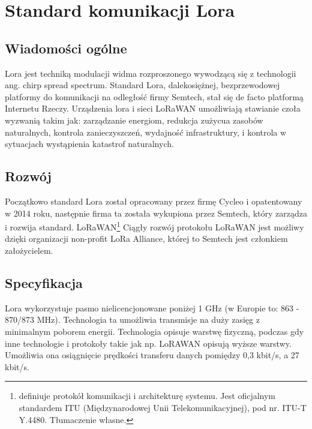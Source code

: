 \newpage %
\section{Standard komunikacji Lora}
\subsection{Wiadomości ogólne}
Lora\cite{lora} jest techniką modulacji widma rozproszonego wywodzącą się z technologii ang. chirp spread spectrum.
Standard Lora, dalekosiężnej, bezprzewodowej platformy do komunikacji na odległość firmy Semtech, stał się de facto platformą Internetu Rzeczy.
Urządzenia lora i sieci LoRaWAN umożliwiają stawianie czoła wyzwanią takim jak: zarządzanie energiom, redukcja zużycua zasobów naturalnych, kontrola zanieczyszczeń, wydajność infrastruktury, i kontrola w sytuacjach wystąpienia katastrof naturalnych.
\subsection{Rozwój}
Początkowo standard Lora został opracowany przez firmę Cycleo i opatentowany w 2014 roku, następnie firma ta została wykupiona przez Semtech, który zarządza i rozwija standard.
LoRaWAN\footnote{definiuje protokół komunikacji i architekturę systemu. Jest oficjalnym standardem ITU (Międzynarodowej Unii Telekomunikacyjnej), pod nr. ITU-T Y.4480. Tłumaczenie własne.}
Ciągły rozwój protokołu LoRaWAN jest możliwy dzięki organizacji non-profit LoRa Alliance, której to Semtech jest członkiem założycielem.
\subsection{Specyfikacja}
Lora wykorzystuje pasmo nielicencjonowane poniżej 1 GHz (w Europie to: 863 - 870/873 MHz). Technologia ta umożliwia transmisje na duży zasięg z minimalnym poborem energii. Technologia opisuje warstwę fizyczną, podczas gdy inne technologie i protokoły takie jak np. LoRAWAN opisują wyższe warstwy. Umożliwia ona osiągnięcie prędkości transferu danych pomiędzy 0,3 kbit/s, a 27 kbit/s.
